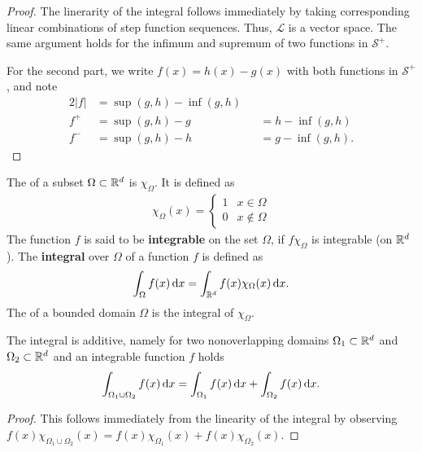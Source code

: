 \begin{proof}
  The linerarity of the integral follows immediately by taking
  corresponding linear combinations of step function sequences. Thus,
  $\mathcal L$ is a vector space. The same argument holds for the
  infimum and supremum of two functions in $\mathcal S^+$.

  For the second part, we write $f(x)=h(x)-g(x)$ with both functions
  in $\mathcal S^+$, and note
  \begin{alignat*}{2}
    |f| &= \sup(g,h) - \inf(g,h) \\
    f^+ &= \sup(g,h) - g &&= h - \inf(g,h) \\
    f^- &= \sup(g,h) - h &&= g - \inf(g,h).
  \end{alignat*}
\end{proof}

\begin{definition}
  The  of a subset $\Omega\subset\mathbb R^d$ is
  $\chi_{\Omega}$. It is defined as
  \begin{gather*}
    \chi_{\Omega}(x) =
    \begin{cases}
      1 & x\in \Omega \\
      0 & x\not\in \Omega
    \end{cases}
  \end{gather*}
  The function $f$ is said to be \textbf{integrable} on the set
  $\Omega$, if $f\chi_\Omega$ is integrable (on $\mathbb R^d$). The
  \textbf{integral} over $\Omega$ of a function $f$ is defined as
  \begin{gather*}
    \int_\Omega f(x)\,\mathrm{d} x = \int_{\mathbb R^d} f(x) \chi_\Omega(x)\,\mathrm{d} x.
  \end{gather*}
  The  of a bounded domain $\Omega$ is the integral of
  $\chi_\Omega$.
\end{definition}

\begin{corollary}
  The integral is additive, namely for two nonoverlapping domains
  $\Omega_1\subset\mathbb R^d$ and $\Omega_2\subset\mathbb R^d$ and an integrable
  function $f$ holds
  \begin{gather*}
    \int_{\Omega_1\cup\Omega_2} f(x)\,\mathrm{d} x = \int_{\Omega_1} f(x)\,\mathrm{d} x + \int_{\Omega_2} f(x)\,\mathrm{d} x.
  \end{gather*}
\end{corollary}

\begin{proof}
  This follows immediately from the linearity of the integral by
  observing $f(x)\chi_{\Omega_1\cup\Omega_2}(x) =
  f(x)\chi_{\Omega_1}(x)+f(x)\chi_{\Omega_2}(x)$.
\end{proof}


